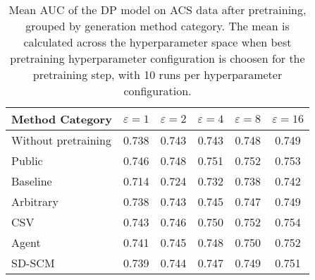 \begin{table}[h!]
    \centering
    \caption{Mean AUC of the DP model on ACS data after pretraining, grouped by generation method category. The mean is calculated across the hyperparameter space when best pretraining hyperparameter configuration is choosen for the pretraining step, with 10 runs per hyperparameter configuration.}
    \label{tab:epsilon_comparison}
    \begin{tabular}{lccccc}
    \toprule
    Method Category & $\varepsilon=1$ & $\varepsilon=2$ & $\varepsilon=4$ & $\varepsilon=8$ & $\varepsilon=16$ \\
    \midrule
    Without pretraining & 0.738 & 0.743 & 0.743 & 0.748 & 0.749 \\
    \arrayrulecolor{black!50!}\midrule
    Public & \cellcolor{gold!30}0.746 & \cellcolor{gold!30}0.748 & \cellcolor{gold!30}0.751 & \cellcolor{gold!30}0.752 & \cellcolor{silver!30}0.753 \\
    \arrayrulecolor{black!50!}\midrule
    Baseline & 0.714 & 0.724 & 0.732 & 0.738 & 0.742 \\
    \arrayrulecolor{black!50!}\midrule
    Arbitrary & 0.738 & 0.743 & 0.745 & 0.747 & 0.749 \\
    \arrayrulecolor{black!50!}\midrule
    CSV & \cellcolor{silver!30}0.743 & \cellcolor{silver!30}0.746 & \cellcolor{silver!30}0.750 & \cellcolor{gold!30}0.752 & \cellcolor{gold!30}0.754 \\
    Agent & \cellcolor{bronze!30}0.741 & \cellcolor{bronze!30}0.745 & \cellcolor{bronze!30}0.748 & \cellcolor{silver!30}0.750 & \cellcolor{bronze!30}0.752 \\
    SD-SCM & 0.739 & 0.744 & 0.747 & \cellcolor{bronze!30}0.749 & 0.751 \\
    \bottomrule
    \end{tabular}
\end{table}